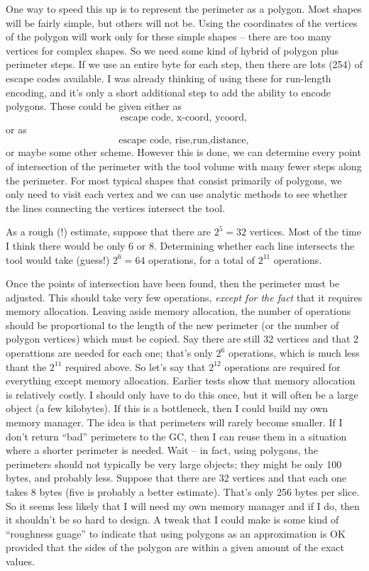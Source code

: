 \documentclass[titlepage,oneside,10pt]{article}
\begin{document}
One way to speed this up is to represent the perimeter as a
polygon. Most shapes will be fairly simple, but others will not
be. Using the coordinates of the vertices of the polygon will work
only for these simple shapes -- there are too many vertices for
complex shapes. So we need some kind of hybrid of polygon plus
perimeter steps. If we use an entire byte for each step, then there
are lots (254) of escape codes available. I was already thinking of
using these for run-length encoding, and it's only a short additional
step to add the ability to encode polygons. These could be given
either as
$$\mbox{escape code, x-coord, ycoord},$$
or as
$$\mbox{escape code, rise,run,distance},$$
or maybe some other scheme. However this is done, we can determine
every point of intersection of the perimeter with the tool volume with
many fewer steps along the perimeter. For most typical shapes that
consist primarily of polygons, we only need to visit each vertex and
we can use analytic methods to see whether the lines connecting the
vertices intersect the tool.

As a rough (!) estimate, suppose that there are $2^5=32$ vertices. Most of
the time I think there would be only 6 or 8. Determining whether each
line intersects the tool would take (guess!) $2^6=64$ operations, for a
total of $2^{11}$ operations. 

Once the points of intersection have been found, then the perimeter
must be adjusted. This should take very few operations, \emph{except
  for the fact} that it requires memory allocation. Leaving aside
memory allocation, the number of operations should be proportional to
the length of the new perimeter (or the number of polygon
vertices) which must be copied. Say there are still 32 vertices and
that 2 operattions are needed for each one; that's only $2^6$
operations, which is much less thant the $2^{11}$ required above. So
let's say that $2^{12}$ operations are required for everything except
memory allocation. Earlier tests show that memory allocation is
relatively costly. I should only have to do this once,
but it will often be a large object (a few kilobytes). If this is a
bottleneck, then I could build my own memory manager. The idea is that
perimeters will rarely become smaller. If I don't return ``bad''
perimeters to the GC, then I can reuse them in a situation where a
shorter perimeter is needed. Wait -- in fact, using polygons, the
perimeters should not typically be very large objects; they might be
only 100 bytes, and probably less. Suppose that there are 32 vertices
and that each one takes 8 bytes (five is probably a better
estimate). That's only 256 bytes per slice. So it seems less likely
that I will need my own memory manager and if I do, then it shouldn't
be so hard to design. A tweak that I could make is some kind of
``roughness guage'' to indicate that using polygons as an
approximation is OK provided that the sides of the polygon are within
a given amount of the exact values.
\end{document}
